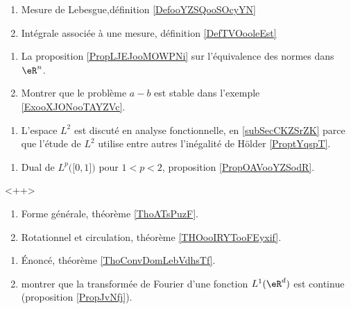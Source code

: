     \begin{enumerate}
        \item
            Mesure de Lebesgue,définition \ref{DefooYZSQooSOcyYN}
        \item
            Intégrale associée à une mesure, définition \ref{DefTVOooleEst}
        \end{enumerate}

    \begin{enumerate}
\item
    La proposition \ref{PropLJEJooMOWPNi} sur l'équivalence des normes dans \( \eR^n\).
\item
    Montrer que le problème \( a-b\) est stable dans l'exemple \ref{ExooXJONooTAYZVc}.
\end{enumerate}

    \begin{enumerate}
\item
    L'espace \( L^2\)  est discuté en analyse fonctionnelle, en \ref{subSecCKZSrZK} parce que l'étude de \( L^2\) utilise entre autres l'inégalité de Hölder \ref{ProptYqspT}.
\end{enumerate}

\begin{enumerate}
    \item
        Dual de \( L^p\big( \mathopen[ 0 , 1 \mathclose] \big)\) pour \( 1<p<2\), proposition \ref{PropOAVooYZSodR}.
\end{enumerate}
<++>

    \begin{enumerate}
        \item
            Forme générale, théorème \ref{ThoATsPuzF}.
        \item
            Rotationnel et circulation, théorème \ref{THOooIRYTooFEyxif}.
        \end{enumerate}

    \begin{enumerate}
        \item
            Énoncé, théorème \ref{ThoConvDomLebVdhsTf}.
        \item
            montrer que la transformée de Fourier d'une fonction \( L^1(\eR^d)\) est continue (proposition \ref{PropJvNfj}).
        \end{enumerate}

